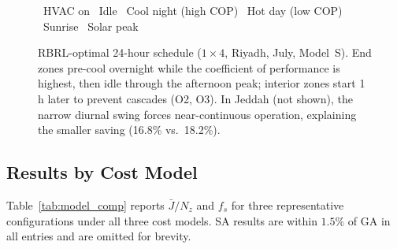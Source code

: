 \documentclass[3p,number]{elsarticle}
\let\oldsubsection\subsection
\renewcommand{\subsection}{\FloatBarrier\oldsubsection}
\newcommand{\Jbar}{\bar{J}}
\begin{document}
\begin{figure}[!t]
\vspace{3pt}
\begin{center}
\small
{}~HVAC on\enspace
{}~Idle\enspace
{}~Cool night (high COP)\enspace
{}~Hot day (low COP)\enspace
{}~Sunrise\enspace
{}~Solar peak
\end{center}
\caption{RBRL-optimal 24-hour schedule ($1\!\times\!4$, Riyadh, July,
Model~S). End zones pre-cool overnight while the coefficient of performance is highest, then idle through the afternoon peak;
interior zones start 1\,h later to prevent cascades (O2, O3).
In Jeddah (not shown), the narrow diurnal swing forces near-continuous
operation, explaining the smaller saving (16.8\% vs.\ 18.2\%).}
\label{fig:gantt}
\end{figure}
 
 
\subsection{Results by Cost Model}
\label{subsec:res_all}
 
Table~\ref{tab:model_comp} reports $\Jbar/N_z$ and $f_s$ for three representative configurations under all three cost models.
SA results are within $1.5\%$ of GA in all entries and are omitted for brevity.
 
\end{document}
